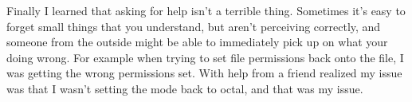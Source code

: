 \documentclass[letterpaper,10pt]{article}
\begin{document}
\begin{description}
Finally I learned that asking for help isn't a terrible thing. Sometimes it's
easy to forget small things that you understand, but aren't perceiving
correctly, and someone from the outside might be able to immediately pick up on
what your doing wrong. For example when trying to set file permissions back
onto the file, I was getting the wrong permissions set. With help from a friend
realized my issue was that I wasn't setting the mode back to octal, and that
was my issue.
\end{description}
\end{document}
